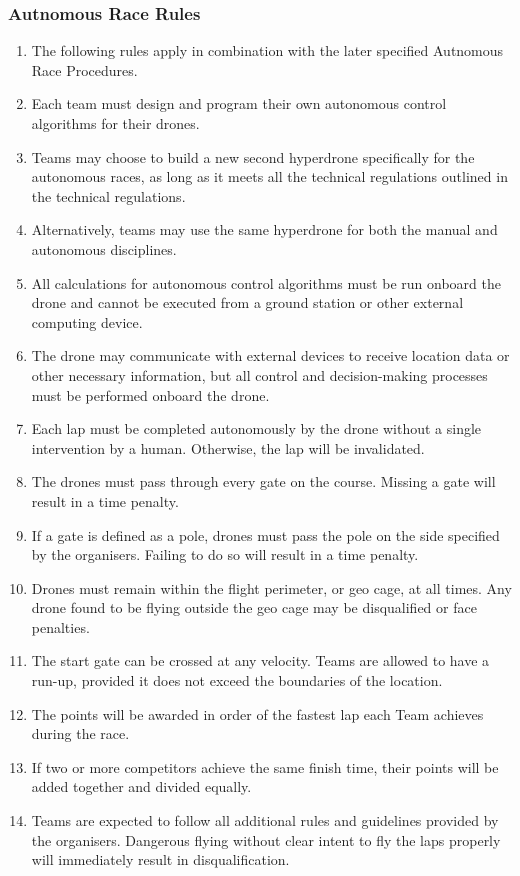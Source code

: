     \subsubsection{Autnomous Race Rules}
    \begin{enumerate}
    \item The following rules apply in combination with the later specified Autnomous Race Procedures.
    \item Each team must design and program their own autonomous control algorithms for their drones.
    \item Teams may choose to build a new second hyperdrone specifically for the autonomous races, as long as it meets all the technical regulations outlined in the technical regulations.
    \item Alternatively, teams may use the same hyperdrone for both the manual and autonomous disciplines.
    \item All calculations for autonomous control algorithms must be run onboard the drone and cannot be executed from a ground station or other external computing device.
    \item The drone may communicate with external devices to receive location data or other necessary information, but all control and decision-making processes must be performed onboard the drone.
    \item Each lap must be completed autonomously by the drone without a single intervention by a human. Otherwise, the lap will be invalidated.
    \item The drones must pass through every gate on the course. Missing a gate will result in a time penalty.
    \item If a gate is defined as a pole, drones must pass the pole on the side specified by the organisers. Failing to do so will result in a time penalty.
    \item Drones must remain within the flight perimeter, or geo cage, at all times. Any drone found to be flying outside the geo cage may be disqualified or face penalties.
    \item The start gate can be crossed at any velocity. Teams are allowed to have a run-up, provided it does not exceed the boundaries of the location.
    \item The points will be awarded in order of the fastest lap each Team achieves during the race.
    \item If two or more competitors achieve the same finish time, their points will be added together and divided equally.
    \item Teams are expected to follow all additional rules and guidelines provided by the organisers. Dangerous flying without clear intent to fly the laps properly will immediately result in disqualification.
    \end{enumerate}

